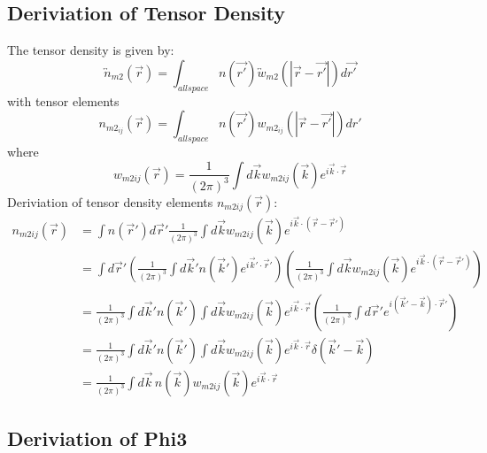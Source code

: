 \documentclass[letterpaper,twocolumn,amsmath,amssymb,prb]{revtex4-1}
\begin{document}
\begin{widetext}
\subsection{Deriviation of Tensor Density} 
\noindent The tensor density is given by:
\begin{equation}{\overleftrightarrow{n}_{m2}(\vec{r})=\int_{allspace}n(\vec{r'})\overleftrightarrow{w}_{m2}(|\vec{r}-\vec{r'}|)d{\vec{r'}}}\end{equation}
with tensor elements  
\begin{displaymath}{n_{m2_{ij}}(\vec{r})=\int_{allspace}n(\vec{r'})w_{m2_{ij}}(|\vec{r}-\vec{r'}|)d{r'}}\end{displaymath} 
where
\begin{equation}{w_{m2ij}(\vec r)= \frac1{(2\pi)^3}\int d\vec k w_{m2ij}(\vec k)e^{i\vec k\cdot \vec r}}\end{equation} 
Deriviation of tensor density elements $n_{m2ij}(\vec{r})$:
\begin{align}
    n_{m2ij}(\vec r) &= \int n(\vec r') d\vec r' \frac1{(2\pi)^3}\int d\vec k w_{m2ij}(\vec k)e^{i\vec k\cdot (\vec r-\vec r')} \\
    &= \int d\vec r' \left(\frac1{(2\pi)^3}\int d\vec k' n(\vec k')e^{i\vec k'\cdot \vec r'}\right) \left(\frac1{(2\pi)^3}\int d\vec k w_{m2ij}(\vec k)e^{i\vec k\cdot (\vec r-\vec r')}\right) \\
    &=  \frac1{(2\pi)^3}\int d\vec k' n(\vec k') \int d\vec k w_{m2ij}(\vec k)
    e^{i\vec k\cdot \vec r}\left(\frac1{(2\pi)^3}\int d\vec r'e^{i(\vec k'-\vec k)\cdot \vec r'}\right)
    \\
    &= \frac1{(2\pi)^3}\int d\vec k' n(\vec k') \int d\vec k w_{m2ij}(\vec k)e^{i\vec k\cdot \vec r}\delta(\vec k'-\vec k)
    \\
    &= \frac1{(2\pi)^3}\int d\vec k\, n(\vec k) w_{m2ij}(\vec k)e^{i\vec k\cdot \vec r}
  \end{align} 
\[{}\]


\subsection{Deriviation of Phi3}


\end{widetext}
\end{document}
